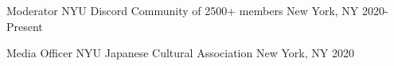 



\begin{cvhonors}

  \cvhonor
    {Moderator} %
    {NYU Discord Community of 2500+ members} %
    {New York, NY} %
    {2020-Present} %
    
  \cvhonor
    {Media Officer} %
    {NYU Japanese Cultural Association} %
    {New York, NY} %
    {2020} %

\end{cvhonors}


